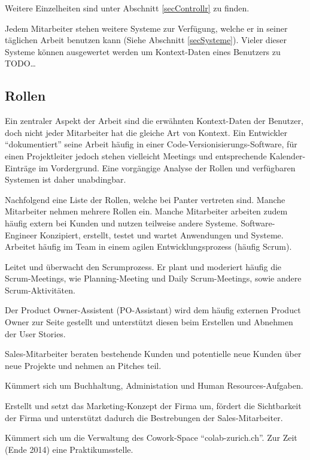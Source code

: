 \documentclass[]{article}
\begin{document}
Weitere Einzelheiten sind unter Abschnitt \ref{secControllr} zu finden.

Jedem Mitarbeiter stehen weitere Systeme zur Verfügung, welche er in
seiner täglichen Arbeit benutzen kann (Siehe Abschnitt
\ref{secSysteme}). Vieler dieser Systeme können ausgewertet werden um
Kontext-Daten eines Benutzers zu TODO\ldots{}

\subsection{Rollen}\label{rollen}

Ein zentraler Aspekt der Arbeit sind die erwähnten Kontext-Daten der
Benutzer, doch nicht jeder Mitarbeiter hat die gleiche Art von Kontext.
Ein Entwickler ``dokumentiert'' seine Arbeit häufig in einer
Code-Versionisierungs-Software, für einen Projektleiter jedoch stehen
vielleicht Meetings und entsprechende Kalender-Einträge im Vordergrund.
Eine vorgängige Analyse der Rollen und verfügbaren Systemen ist daher
unabdingbar.

Nachfolgend eine Liste der Rollen, welche bei Panter vertreten sind.
Manche Mitarbeiter nehmen mehrere Rollen ein. Manche Mitarbeiter
arbeiten zudem häufig extern bei Kunden und nutzen teilweise andere
Systeme. Software-Engineer Konzipiert, erstellt, testet und wartet
Anwendungen und Systeme. Arbeitet häufig im Team in einem agilen
Entwicklungsprozess (häufig Scrum).

\begin{description}
\itemsep1pt\parskip0pt
\item[Scrum-Master]
Leitet und überwacht den Scrumprozess. Er plant und moderiert häufig die
Scrum-Meetings, wie Planning-Meeting und Daily Scrum-Meetings, sowie
andere Scrum-Aktivitäten.
\item[Product Owner-Assistent]
Der Product Owner-Assistent (PO-Assistant) wird dem häufig externen
Product Owner zur Seite gestellt und unterstützt diesen beim Erstellen
und Abnehmen der User Stories.
\item[Sales]
Sales-Mitarbeiter beraten bestehende Kunden und potentielle neue Kunden
über neue Projekte und nehmen an Pitches teil.
\item[Administration]
Kümmert sich um Buchhaltung, Administation und Human Resources-Aufgaben.
\item[Marketing]
Erstellt und setzt das Marketing-Konzept der Firma um, fördert die
Sichtbarkeit der Firma und unterstützt dadurch die Bestrebungen der
Sales-Mitarbeiter.
\item[Community-Manager]
Kümmert sich um die Verwaltung des Cowork-Space ``colab-zurich.ch''. Zur
Zeit (Ende 2014) eine Praktikumsstelle.
\end{description}
\end{document}
